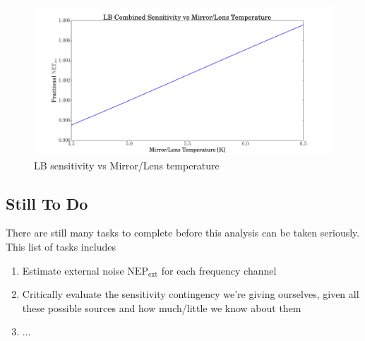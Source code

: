 \documentclass[12pt, titlepage]{article} %
\begin{document}
\begin{figure}[H]
	\centering
	\includegraphics[width=1.1\textwidth, center]{PDF/TempDependence_MirrorLens_LB.pdf}
	\caption{LB sensitivity vs Mirror/Lens temperature}
\end{figure}


\subsection{Still To Do}

There are still many tasks to complete before this analysis can be taken seriously. This list of tasks includes

\begin{enumerate}
	\item Estimate external noise $\mathrm{NEP_{ext}}$ for each frequency channel
	\item Critically evaluate the sensitivity contingency we're giving ourselves, given all these possible sources and how much/little we know about them
	\item ...
\end{enumerate}



\newpage
\end{document}
